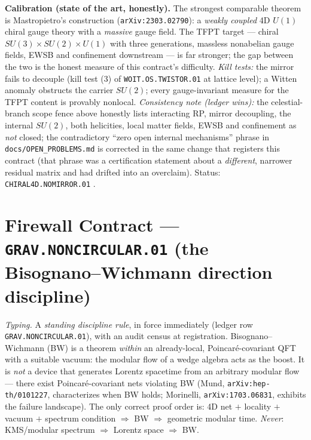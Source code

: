 \documentclass[11pt,a4paper]{article}
\begin{document}
\par\smallskip\noindent\textbf{Calibration (state of the art, honestly).}  The strongest
comparable theorem is Mastropietro's construction (\texttt{arXiv:2303.02790}): a \emph{weakly
coupled} 4D $U(1)$ chiral gauge theory with a \emph{massive} gauge field.  The TFPT target ---
chiral $SU(3){\times}SU(2){\times}U(1)$ with three generations, massless nonabelian gauge
fields, EWSB and confinement downstream --- is far stronger; the gap between the two is the
honest measure of this contract's difficulty.  \emph{Kill tests:} the mirror fails to decouple
(kill test (3) of \texttt{WOIT.OS.TWISTOR.01} at lattice level); a Witten anomaly obstructs the
carrier $SU(2)$; every gauge-invariant measure for the TFPT content is provably nonlocal.
\emph{Consistency note (ledger wins):} the celestial-branch scope fence above honestly lists
interacting RP, mirror decoupling, the internal $SU(2)$, both helicities, local matter fields,
EWSB and confinement as \emph{not} closed; the contradictory ``zero open internal mechanisms''
phrase in \texttt{docs/OPEN\_PROBLEMS.md} is corrected in the same change that registers this
contract (that phrase was a certification statement about a \emph{different}, narrower residual
matrix and had drifted into an overclaim).  Status: \texttt{CHIRAL4D.NOMIRROR.01} \mO.

\section*{Firewall Contract --- \texttt{GRAV.NONCIRCULAR.01} (the Bisognano--Wichmann direction discipline)}
\noindent\emph{Typing.} A \emph{standing discipline rule}, in force immediately (ledger row
\texttt{GRAV.NONCIRCULAR.01}), with an audit census at registration.  Bisognano--Wichmann (BW)
is a theorem \emph{within} an already-local, Poincar\'e-covariant QFT with a suitable vacuum:
the modular flow of a wedge algebra acts as the boost.  It is \emph{not} a device that generates
Lorentz spacetime from an arbitrary modular flow --- there exist Poincar\'e-covariant nets
violating BW (Mund, \texttt{arXiv:hep-th/0101227}, characterizes when BW holds; Morinelli,
\texttt{arXiv:1703.06831}, exhibits the failure landscape).  The only correct proof order is:
4D net $+$ locality $+$ vacuum $+$ spectrum condition $\Rightarrow$ BW $\Rightarrow$ geometric
modular time.  \emph{Never}: KMS/modular spectrum $\Rightarrow$ Lorentz space $\Rightarrow$ BW.
\end{document}
